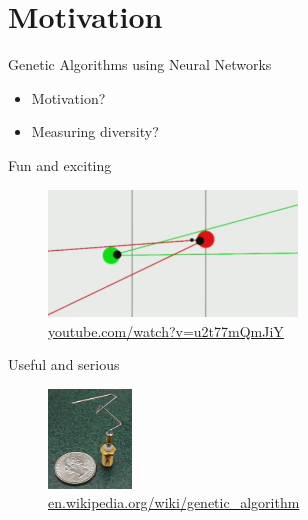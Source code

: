 
\section{Motivation }

\begin{frame}{Genetic Algorithms using Neural Networks}

  \begin{itemize}
    \item Motivation?
    \item Measuring diversity?
  \end{itemize}
\end{frame}

\begin{frame}{Fun and exciting}
  \begin{figure}
    \centering
    \includegraphics[width=250px]{elias/images/sniper.png}
    \caption{\url{youtube.com/watch?v=u2t77mQmJiY}}
  \end{figure}
\end{frame}


\begin{frame}{Useful and serious}
  \begin{figure}
    \centering
    \includegraphics[height=100px]{elias/images/antenna.jpg}
    \caption{\url{en.wikipedia.org/wiki/genetic_algorithm}}
  \end{figure}
\end{frame}

